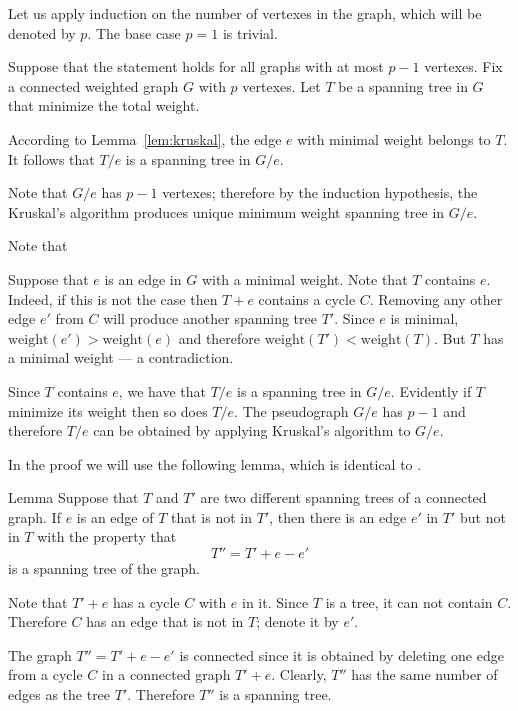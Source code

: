Let us apply induction on the number of vertexes in the graph, which will be denoted by $p$.
The base case $p=1$ is trivial.

Suppose that the statement holds for all graphs with at most $p-1$ vertexes.
Fix a connected weighted graph $G$ with $p$ vertexes.
Let $T$ be a spanning tree in $G$ that minimize the total weight.

According to Lemma~\ref{lem:kruskal}, the edge $e$ with minimal weight belongs to $T$. 
It follows that $T/e$ is a spanning tree in $G/e$.

Note that $G/e$ has $p-1$ vertexes;
therefore by the induction hypothesis, the Kruskal's algorithm produces unique minimum weight spanning tree in $G/e$.

Note that 


Suppose that $e$ is an edge in $G$ with a minimal weight.
Note that $T$ contains $e$.
Indeed, if this is not the case then $T+e$ contains a cycle $C$.
Removing any other edge $e'$ from $C$ will produce another spanning tree $T'$.
Since $e$ is minimal, $\mathrm{weight}(e')>\mathrm{weight}(e)$ and therefore $\mathrm{weight}(T')<\mathrm{weight}(T)$.
But $T$ has a minimal weight --- a contradiction.

Since $T$ contains $e$, we have that $T/e$ is a spanning tree in $G/e$.
Evidently if $T$ minimize its weight then so does $T/e$.
The pseudograph $G/e$ has $p-1$ and therefore $T/e$ can be obtained by applying Kruskal’s algorithm to $G/e$.
\qeds
\qeds

In the proof we will use the following lemma, which is identical to \cite[Exercises 7.1.6]{hartsfield-ringel}. 

\begin{thm}{Lemma}\label{lem:T+e-e}
Suppose that $T$ and $T'$ are two different spanning trees of a connected
graph. 
If $e$ is an edge of $T$ that is not in $T'$, then there is an edge $e'$
in $T'$ but not in $T$ with the property that 
\[T''=T' + e - e'\]
is a spanning tree of the
graph.
\end{thm}

Note that $T' + e$ has a cycle $C$ with $e$ in it.
Since $T$ is a tree, it can not contain $C$.
Therefore $C$ has an edge that is not in $T$;
denote it by $e'$.

The graph $T''=T' + e-e'$ is connected since it is obtained by deleting one edge from a cycle $C$ in a connected graph $T' + e$.
Clearly, $T''$ has the same number of edges as the tree $T'$.
Therefore $T''$ is a spanning tree.
\qeds

